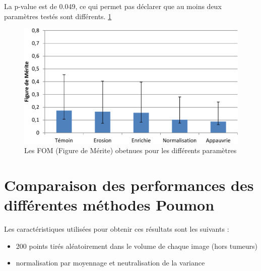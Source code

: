 La p-value est de 0.049, ce qui permet pas déclarer que au moins deux paramètres testés sont différents. \ref{lab:fom_param}


\begin{figure}[h!]
 \begin{center}
   \includegraphics[width=15cm]{images/FOM_param}
 \end{center}
 \caption{ \label{lab:fom_param} Les FOM (Figure de Mérite) obetnues pour les différents paramètres}
\end{figure}

\FloatBarrier

\section{Comparaison des performances des différentes méthodes Poumon}

Les caractéristiques utilisées pour obtenir ces résultats sont les suivants :

\begin{itemize}
 \item 200 points tirés aléatoirement dans le volume de chaque image (hors tumeurs)
 \item normalisation par moyennage et neutralisation de la variance 
\end{itemize}



